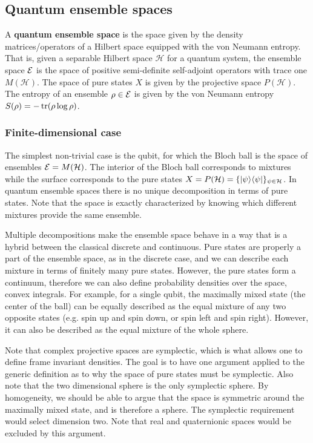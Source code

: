 \subsection{Quantum ensemble spaces}

\begin{defn}
	A \textbf{quantum ensemble space} is the space given by the density matrices/operators of a Hilbert space equipped with the von Neumann entropy. That is, given a separable Hilbert space $\mathcal{H}$ for a quantum system, the ensemble space $\mathcal{E}$ is the space of positive semi-definite self-adjoint operators with trace one $M(\mathcal{H})$. The space of pure states $X$ is given by the projective space $P(\mathcal{H})$. The entropy of an ensemble $\rho \in \mathcal{E}$ is given by the von Neumann entropy $S(\rho) = -\operatorname{tr}(\rho \log \rho)$.
\end{defn}

\subsubsection{Finite-dimensional case}

The simplest non-trivial case is the qubit, for which the Bloch ball is the space of ensembles $\mathcal{E} = M(\mathcal{H})$. The interior of the Bloch ball corresponds to mixtures  while the surface corresponds to the pure states $X = P(\mathcal{H}) = \{ |\psi\rangle \langle\psi| \}_{\psi \in \mathcal{H}}$. In quantum ensemble spaces there is no unique decomposition in terms of pure states. Note that the space is exactly characterized by knowing which different mixtures provide the same ensemble.

Multiple decompositions make the ensemble space behave in a way that is a hybrid between the classical discrete and continuous. Pure states are properly a part of the ensemble space, as in the discrete case, and we can describe each mixture in terms of finitely many pure states. However, the pure states form a continuum, therefore we can also define probability densities over the space, convex integrals. For example, for a single qubit, the maximally mixed state (the center of the ball) can be equally described as the equal mixture of any two opposite states (e.g. spin up and spin down, or spin left and spin right). However, it can also be described as the equal mixture of the whole sphere.

Note that complex projective spaces are symplectic, which is what allows one to define frame invariant densities. The goal is to have one argument applied to the generic definition as to why the space of pure states must be symplectic. Also note that the two dimensional sphere is the only symplectic sphere. By homogeneity, we should be able to argue that the space is symmetric around the maximally mixed state, and is therefore a sphere. The symplectic requirement would select dimension two. Note that real and quaternionic spaces would be excluded by this argument.

